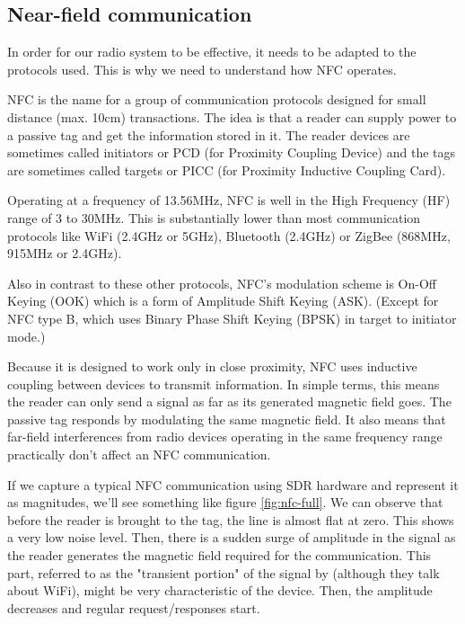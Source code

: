 \subsection{Near-field communication} \label{nfc}

In order for our radio system to be effective, it needs to be adapted to the protocols used. This is why we need to understand how NFC operates.

NFC is the name for a group of communication protocols designed for small distance (max. 10cm) transactions. The idea is that a reader can supply power to a passive tag and get the information stored in it. The reader devices are sometimes called initiators or PCD (for Proximity Coupling Device) and the tags are sometimes called targets or PICC (for Proximity Inductive Coupling Card).

Operating at a frequency of 13.56MHz, NFC is well in the High Frequency (HF) range of 3 to 30MHz. This is substantially lower than most communication protocols like WiFi (2.4GHz or 5GHz), Bluetooth (2.4GHz) or ZigBee (868MHz, 915MHz or 2.4GHz).

Also in contrast to these other protocols, NFC's modulation scheme is On-Off Keying (OOK) which is a form of Amplitude Shift Keying (ASK). (Except for NFC type B, which uses Binary Phase Shift Keying (BPSK) in target to initiator mode.)

Because it is designed to work only in close proximity, NFC uses inductive coupling between devices to transmit information. In simple terms, this means the reader can only send a signal as far as its generated magnetic field goes. The passive tag responds by modulating the same magnetic field. It also means that far-field interferences from radio devices operating in the same frequency range practically don't affect an NFC communication. \cite{wiki_near-field_2020}

If we capture a typical NFC communication using SDR hardware and represent it as magnitudes, we'll see something like figure \ref{fig:nfc-full}. We can observe that before the reader is brought to the tag, the line is almost flat at zero. This shows a very low noise level. Then, there is a sudden surge of amplitude in the signal as the reader generates the magnetic field required for the communication. This part, referred to as the "transient portion" of the signal by \textcite{xu_device_2015} (although they talk about WiFi), might be very characteristic of the device. Then, the amplitude decreases and regular request/responses start.

